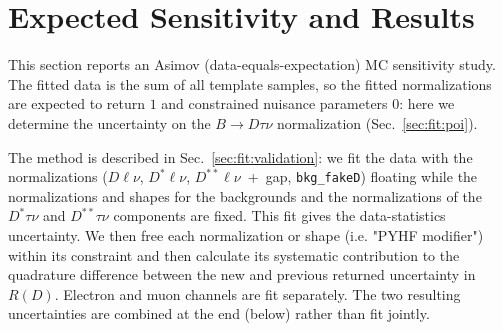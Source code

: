 \section{Expected Sensitivity and Results}
\label{sec:results}

This section reports an Asimov (data-equals-expectation) MC sensitivity
study. The fitted data is the sum of all template samples, so the
fitted normalizations are expected to return $1$ and constrained nuisance
parameters $0$: here we determine the uncertainty on 
the $B\to D\tau\nu$ normalization (Sec.~\ref{sec:fit:poi}).

The method is described in Sec.~\ref{sec:fit:validation}: we fit the data with 
the normalizations ($D\ell\nu$, $D^{*}\ell\nu$, $D^{**}\ell\nu$~+~gap,
\texttt{bkg\_fakeD}) floating while the normalizations and shapes for the 
 backgrounds and the normalizations of the $D^*\tau \nu$ and $D^{**} \tau \nu$ components are fixed. 
This fit gives the data-statistics
uncertainty. 
We then free each normalization or shape (i.e. "PYHF modifier") within its constraint and then
calculate its systematic contribution to the quadrature difference between
the new and previous returned uncertainty in $R(D)$.
Electron and muon channels are fit separately. The two resulting
uncertainties are combined at the end (below) rather than fit jointly.

